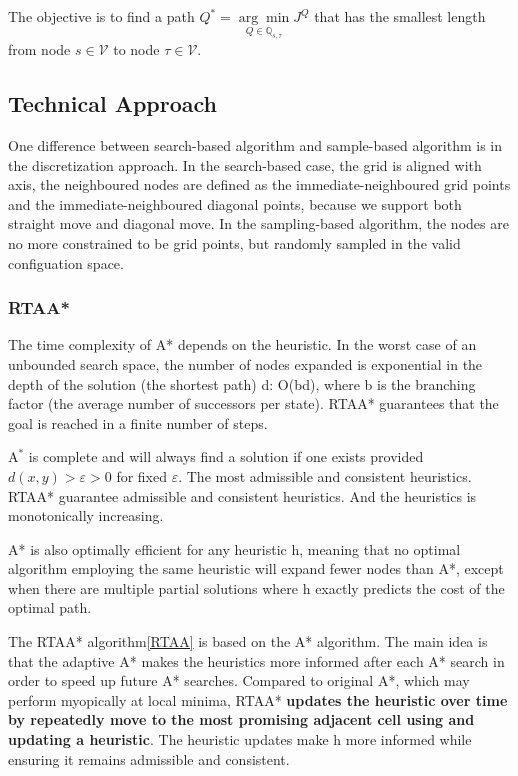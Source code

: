 \documentclass{article} %
\begin{document}
The objective is to find a path $Q^{*}=\underset{Q \in \mathbb{Q}_{s, \tau}}{\arg \min } J^{Q}$ that has the smallest length from node $s \in \mathcal{V}$ to node $\tau \in \mathcal{V}$.

\subsection{Technical Approach}

One difference between search-based algorithm and sample-based algorithm is in the discretization approach. In the search-based case, the grid is aligned with axis, the neighboured nodes are defined as the immediate-neighboured grid points and the immediate-neighboured diagonal points, because we support both straight move and diagonal move. In the sampling-based algorithm, the nodes are no more constrained to be grid points, but randomly sampled in the valid configuation space.

\subsubsection{RTAA*}

The time complexity of A* depends on the heuristic. In the worst case of an unbounded search space, the number of nodes expanded is exponential in the depth of the solution (the shortest path) d: O(bd), where b is the branching factor (the average number of successors per state). RTAA* guarantees that the goal is reached in a finite number of steps.

$\mathrm{A}^{*}$ is complete and will always find a solution if one exists provided $d(x, y)>\varepsilon>0$ for fixed $\varepsilon$. The most admissible and consistent heuristics. RTAA* guarantee admissible and consistent heuristics. And the heuristics is monotonically increasing.

A* is also optimally efficient for any heuristic h, meaning that no optimal algorithm employing the same heuristic will expand fewer nodes than A*, except when there are multiple partial solutions where h exactly predicts the cost of the optimal path. 

The RTAA* algorithm\ref{RTAA} is based on the A* algorithm. The main idea is that the adaptive A* makes the heuristics more informed after each A* search in order to speed up future A* searches. Compared to original A*, which may perform myopically at local minima, RTAA* \textbf{updates the heuristic over time by repeatedly move to the most promising adjacent cell using and updating a heuristic}. The heuristic updates make h more informed while ensuring it remains admissible and consistent.
\end{document}

